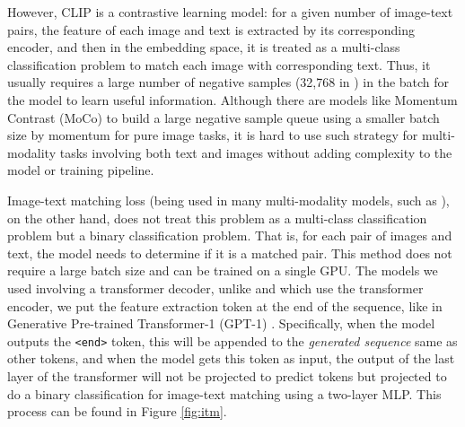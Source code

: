\documentclass[12pt]{article}
\begin{document}
However, CLIP is a contrastive learning model: for a given number of image-text pairs, the feature of each image and text is extracted by its corresponding encoder, and then in the embedding space, it is treated as a multi-class classification problem to match each image with corresponding text. \cite{radford_learning_2021} Thus, it usually requires a large number of negative samples (32,768 in \autocite{radford_learning_2021}) in the batch for the model to learn useful information. \autocite{he_momentum_2020} Although there are models like Momentum Contrast  (MoCo) \autocite{he_momentum_2020} to build a large negative sample queue using a smaller batch size by momentum for pure image tasks, it is hard to use such strategy for multi-modality tasks involving both text and images without adding complexity to the model or training pipeline. 

Image-text matching loss (being used in many multi-modality models, such as \autocite{li_align_2021} \autocite{liao_evaluation_2023}\autocite{xu_attngan:_2017}), on the other hand, does not treat this problem as a multi-class classification problem but a binary classification problem. That is, for each pair of images and text, the model needs to determine if it is a matched pair. This method does not require a large batch size and can be trained on a single GPU. The models we used involving a transformer decoder, unlike \autocite{li_align_2021} and \autocite{kim_vilt:_2021} which use the transformer encoder, we put the feature extraction token at the end of the sequence, like in Generative Pre-trained Transformer-1 (GPT-1) \autocite{alec_improving_nodate}. Specifically, when the model outputs the \verb|<end>| token, this will be appended to the \textit{generated sequence} same as other tokens, and when the model gets this token as input, the output of the last layer of the transformer will not be projected to predict tokens but projected to do a binary classification for image-text matching using a two-layer MLP. This process can be found in Figure \ref{fig:itm}.
\end{document}
